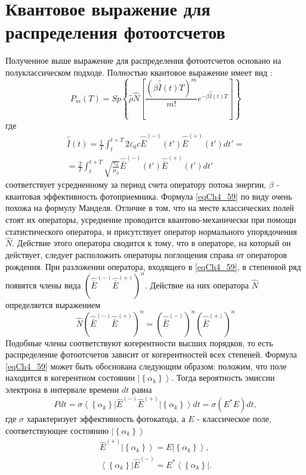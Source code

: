 \section{Квантовое выражение для распределения фотоотсчетов}
Полученное выше выражение для распределения фотоотсчетов основано на
полуклассическом подходе. Полностью квантовое выражение имеет
вид \cite{bLoudon1976}: 
\begin{equation}
P_m\left(T\right) = Sp \left\{
\hat{\rho}\hat{N}
\left[
\frac{\left(\beta \hat{\bar{I}}\left(t\right) T\right)^m}{m!}
e^{- \beta \hat{\bar{I}}\left(t\right) T}
\right]
\right\} 
\label{eqCh4_59}
\end{equation}
где
\begin{eqnarray}
\hat{\bar{I}}\left(t\right) = \frac{1}{T}\int_t^{t + T}2
\varepsilon_0 c \hat{\bar{E}}^{(-)}\left(t'\right)
\hat{\bar{E}}^{(+)}\left(t'\right)dt' =
\nonumber \\
= \frac{2}{T}\int_t^{t + T}
\sqrt{\frac{\varepsilon_0}{\mu_0}} \hat{\bar{E}}^{(-)}\left(t'\right)
\hat{\bar{E}}^{(+)}\left(t'\right)dt'
\nonumber
\end{eqnarray}
соответствует усредненному за период счета оператору потока энергии,
$\beta$ - квантовая эффективность фотоприемника. Формула
\eqref{eqCh4_59} по виду очень 
похожа на формулу Манделя. Отличие в том, что на месте классических
полей стоят их операторы, усреднение проводится квантово-механически
при помощи статистического оператора, и присутствует оператор
нормального упорядочения $\hat{N}$.  Действие этого оператора сводится
к тому, что в операторе, на который он действует, следует расположить 
операторы поглощения справа от операторов рождения. При разложении
оператора, входящего в \eqref{eqCh4_59}, в степенной ряд появятся
члены вида  $\left(\hat{\bar{E}}^{(-)}\hat{\bar{E}}^{(+)}\right)^n$.  
Действие на них оператора $\hat{N}$  определяется выражением 
\[
\hat{N}\left(\hat{\bar{E}}^{(-)}\hat{\bar{E}}^{(+)}\right)^n = 
\left(\hat{\bar{E}}^{(-)}\right)^n\left(\hat{\bar{E}}^{(+)}\right)^n
\]
Подобные члены соответствуют когерентности высших порядков, то есть
распределение фотоотсчетов зависит от когерентностей всех
степеней. Формула \eqref{eqCh4_59} может быть обоснована следующим образом:
положим, что поле находится в когерентном состоянии
$\left|\left\{\alpha_k\right\}\right>$.  Тогда 
вероятность эмиссии электрона в интервале времени $dt$ равна 
\[
Pdt = \sigma
\left<\left\{\alpha_k\right\}\right|
\hat{E}^{(-)} \hat{E}^{(+)}
\left|\left\{\alpha_k\right\}\right> dt = 
\sigma \left(E^{*} E\right)dt,
\]
где $\sigma$ характеризует эффективность фотокатода, а $E$ -
классическое поле, соответствующее состоянию $\left|\left\{\alpha_k\right\}\right>$
\begin{eqnarray}
\hat{E}^{(+)} \left|\left\{\alpha_k\right\}\right> = E \left|\left\{\alpha_k\right\}\right>,
\nonumber \\
\left<\left\{\alpha_k\right\}\right|\hat{E}^{(-)} = E^{*} \left<\left\{\alpha_k\right\}\right|.
\nonumber
\end{eqnarray}


